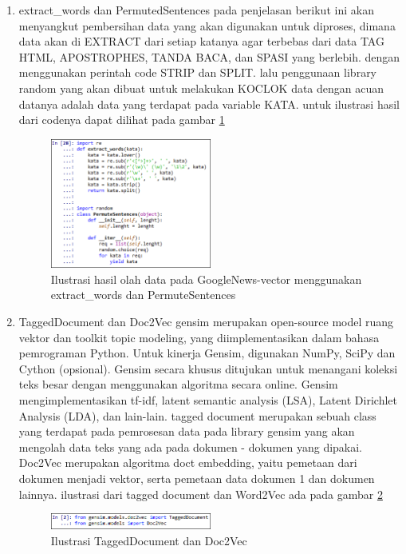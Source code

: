 \begin{enumerate}
\item extract\_words dan PermutedSentences
\subitem pada penjelasan berikut ini akan menyangkut pembersihan data yang akan digunakan untuk diproses, dimana data akan di EXTRACT dari setiap katanya agar terbebas dari data TAG HTML, APOSTROPHES, TANDA BACA, dan SPASI yang berlebih. dengan menggunakan perintah code STRIP dan SPLIT. lalu penggunaan library random yang akan dibuat untuk melakukan KOCLOK data dengan acuan datanya adalah data yang terdapat pada variable KATA. untuk ilustrasi hasil dari codenya dapat dilihat pada gambar \ref{d20}
\begin{figure}[!htbp]
	\centering
	\includegraphics[width=0.5\textwidth]{figures/fathi/chapter5/hari2/14}
	\caption{Ilustrasi hasil olah data  pada GoogleNews-vector menggunakan extract\_words dan PermuteSentences}
	\label{d20}
\end{figure}

\item TaggedDocument dan Doc2Vec
\subitem gensim merupakan open-source model ruang vektor dan toolkit topic modeling, yang diimplementasikan dalam bahasa pemrograman Python. Untuk kinerja Gensim, digunakan NumPy, SciPy dan Cython (opsional). Gensim secara khusus ditujukan untuk menangani koleksi teks besar dengan menggunakan algoritma secara online. Gensim mengimplementasikan tf-idf, latent semantic analysis (LSA), Latent Dirichlet Analysis (LDA), dan lain-lain. 
\subitem tagged document merupakan sebuah class yang terdapat pada pemrosesan data pada library gensim yang akan mengolah data teks yang ada pada dokumen - dokumen yang dipakai.
\subitem Doc2Vec merupakan algoritma doct embedding, yaitu pemetaan dari dokumen menjadi vektor, serta pemetaan data dokumen 1 dan dokumen lainnya.
ilustrasi dari tagged document dan Word2Vec ada pada gambar \ref{d21}
\begin{figure}[!htbp]
	\centering
	\includegraphics[width=0.5\textwidth]{figures/fathi/chapter5/hari3/1}
	\caption{Ilustrasi TaggedDocument dan Doc2Vec }
	\label{d21}
\end{figure}


\end{enumerate}
